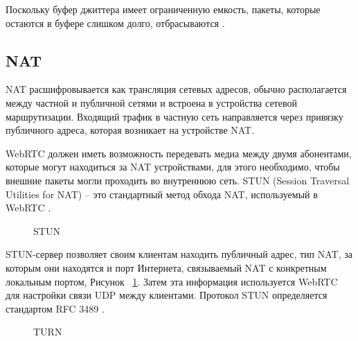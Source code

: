 Поскольку буфер джиттера имеет ограниченную емкость, пакеты, которые остаются в буфере слишком долго, отбрасываются \cite{v13}.

\subsection{NAT}

NAT расшифровывается как трансляция сетевых адресов, обычно располагается между частной и публичной сетями и встроена в устройства сетевой маршрутизации. Входящий трафик в частную сеть направляется через привязку публичного адреса, которая возникает на устройстве NAT.

WebRTC должен иметь возможность передевать медиа между двумя абонентами, которые могут находиться за NAT устройствами, для этого необходимо, чтобы внешние пакеты могли проходить во внутреннюю сеть. STUN (Session Traversal Utilities for NAT) -- это стандартный метод обхода NAT, используемый в WebRTC \cite{v26}.

\begin{figure}[ht]
\begin{center}

\caption{
\label{stun}
     STUN}
\end {center}
\end {figure}


STUN-сервер позволяет своим клиентам находить публичный адрес, тип NAT, за которым они находятся и порт Интернета, связываемый NAT с конкретным локальным портом, Рисунок ~\ref{stun}. Затем эта информация используется WebRTC для настройки связи UDP между клиентами. Протокол STUN определяется стандартом RFC 3489 \cite{v25}.

\begin{figure}[ht]
\begin{center}

\caption{
\label{turn}
     TURN}
\end {center}
\end {figure}

